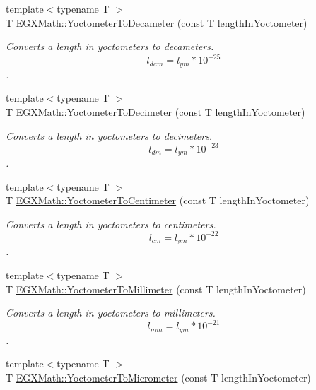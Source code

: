 \begin{DoxyCompactItemize}
{\footnotesize template$<$typename T $>$ }\\T \mbox{\hyperlink{group___e_g_x_math-_conversions-_length_conversions-_s_i-_yoctometer-_s_i_ga63fd1a1af694ca9e3afdefb16cbeffd8}{E\+G\+X\+Math\+::\+Yoctometer\+To\+Decameter}} (const T length\+In\+Yoctometer)
\begin{DoxyCompactList}\small\item\em Converts a length in yoctometers to decameters. \[ l_{dam}=l_{ym} * 10^{-25} \]. \end{DoxyCompactList}\item 
{\footnotesize template$<$typename T $>$ }\\T \mbox{\hyperlink{group___e_g_x_math-_conversions-_length_conversions-_s_i-_yoctometer-_s_i_ga958e0eaa8ecc89db32a3f8189136360c}{E\+G\+X\+Math\+::\+Yoctometer\+To\+Decimeter}} (const T length\+In\+Yoctometer)
\begin{DoxyCompactList}\small\item\em Converts a length in yoctometers to decimeters. \[ l_{dm}=l_{ym} * 10^{-23} \]. \end{DoxyCompactList}\item 
{\footnotesize template$<$typename T $>$ }\\T \mbox{\hyperlink{group___e_g_x_math-_conversions-_length_conversions-_s_i-_yoctometer-_s_i_ga38e9c49d57f1e2af4ff3a8cdb460fe7c}{E\+G\+X\+Math\+::\+Yoctometer\+To\+Centimeter}} (const T length\+In\+Yoctometer)
\begin{DoxyCompactList}\small\item\em Converts a length in yoctometers to centimeters. \[ l_{cm}=l_{ym} * 10^{-22} \]. \end{DoxyCompactList}\item 
{\footnotesize template$<$typename T $>$ }\\T \mbox{\hyperlink{group___e_g_x_math-_conversions-_length_conversions-_s_i-_yoctometer-_s_i_ga599936dd87aba0a05d16c0c5992928ca}{E\+G\+X\+Math\+::\+Yoctometer\+To\+Millimeter}} (const T length\+In\+Yoctometer)
\begin{DoxyCompactList}\small\item\em Converts a length in yoctometers to millimeters. \[ l_{mm}=l_{ym} * 10^{-21} \]. \end{DoxyCompactList}\item 
{\footnotesize template$<$typename T $>$ }\\T \mbox{\hyperlink{group___e_g_x_math-_conversions-_length_conversions-_s_i-_yoctometer-_s_i_ga910145f68803fbaa87afd1d30d48c96e}{E\+G\+X\+Math\+::\+Yoctometer\+To\+Micrometer}} (const T length\+In\+Yoctometer)

\end{DoxyCompactItemize}
